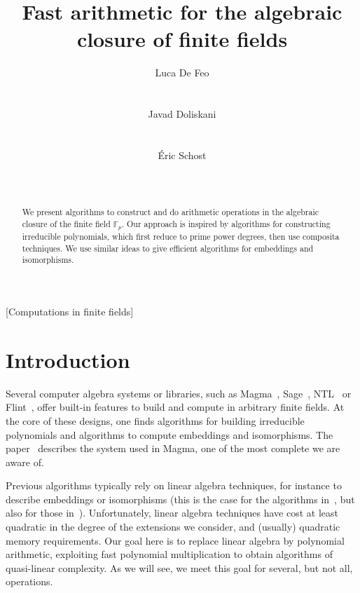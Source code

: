 \documentclass{sig-alternate}
\author{
  \alignauthor Luca De Feo\\
  \affaddr{Laboratoire PRiSM}\\
  \affaddr{Universit\'e de Versailles}\\
  \email{luca.de-feo@uvsq.fr}
  \alignauthor Javad Doliskani\\
  \affaddr{Computer Science Department}\\
  \affaddr{Western University}\\
  \email{jdoliska@uwo.ca}
  \alignauthor \'Eric Schost\\
  \affaddr{Computer Science Department}\\
  \affaddr{Western University}\\
  \email{eschost@uwo.ca}
}
\title{Fast arithmetic for the algebraic closure of finite fields}
\newcounter{algo}
\begin{document}
\maketitle
\begin{abstract}
  We present algorithms to construct and do arithmetic operations in
  the algebraic closure of the finite field $\mathbb{F}_p$. Our
  approach is inspired by algorithms for constructing irreducible
  polynomials, which first reduce to prime power degrees, then use
  composita techniques. We use similar ideas to give efficient
  algorithms for embeddings and isomorphisms.
\end{abstract}

[Computations in finite fields]


\section{Introduction}

Several computer algebra systems or libraries, such as
Magma~\cite{MAGMA}, Sage~\cite{Sage}, NTL~\cite{shoup2003ntl} or
Flint~\cite{hart2010flint}, offer built-in features to build and
compute in arbitrary finite fields. At the core of these designs, one
finds algorithms for building irreducible polynomials and algorithms
to compute embeddings and isomorphisms. The
paper~\cite{bosma+cannon+steel97} describes the system used in Magma,
one of the most complete we are aware of.

Previous algorithms typically rely on linear algebra techniques, for
instance to describe embeddings or isomorphisms (this is the case for
the algorithms in~\cite{bosma+cannon+steel97}, but also for those
in~\cite{LenstraJr91,Allombert02}). Unfortunately, linear algebra
techniques have cost at least quadratic in the degree of the
extensions we consider, and (usually) quadratic memory requirements.
Our goal here is to replace linear algebra by polynomial arithmetic,
exploiting fast polynomial multiplication to obtain algorithms of
quasi-linear complexity. As we will see, we meet this goal for
several, but not all, operations.
\end{document}

